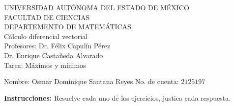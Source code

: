 \documentclass[fleqn, 12pt]{article}
\begin{document}
    \begin{center}
        UNIVERSIDAD AUTÓNOMA DEL ESTADO DE MÉXICO \\
        FACULTAD DE CIENCIAS \\
        DEPARTEMENTO DE MATEMÁTICAS \\
        Cálculo diferencial vectorial \\
        Profesores: Dr. Félix Capulín Pérez \\
        Dr. Enrique Castañeda Alvarado \\
        Tarea: Máximos y mínimos
    \end{center}

    Nombre: Osmar Dominique Santana Reyes \hfill No. de cuenta: $ 2125197 $

    \textbf{Instrucciones:} Resuelve cada uno de los ejercicios, justica cada respuesta.
\end{document}

